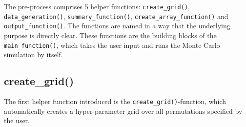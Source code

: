 \documentclass[11pt,a4paper]{article}
\begin{document}
The pre-process comprises 5 helper functions: \texttt{create\_grid()},
\texttt{data\_generation()}, \texttt{summary\_function()},
\texttt{create\_array\_function()} and \texttt{output\_function()}. The
functions are named in a way that the underlying purpose is directly
clear. These functions are the building blocks of the
\texttt{main\_function()}, which takes the user input and runs the Monte
Carlo simulation by itself.

\hypertarget{create_grid}{%
\subsection{create\_grid()}\label{create_grid}}

The first helper function introduced is the
\texttt{create\_grid()}-function, which automatically creates a
hyper-parameter grid over all permutations specified by the user.
\end{document}

